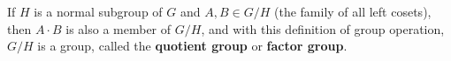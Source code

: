 If $H$ is a normal subgroup of $G$ and $A, B \in G/H$ (the family of all left cosets), then $A \cdot B$ is also a member of $G/H$, and with this definition of group operation, $G/H$ is a group, called the \textbf{quotient group} or \textbf{factor group}.
